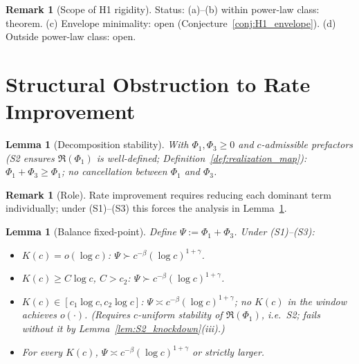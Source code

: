\documentclass[12pt,a4paper]{amsart}
\newtheorem{lemma}[theorem]{Lemma}
\theoremstyle{definition}
\newtheorem{remark}[theorem]{Remark}
\begin{document}
\begin{remark}[Scope of H1 rigidity]
\label{rem:H1_rigidity_scope}
Status: (a)--(b) within power-law class: theorem.
(c) Envelope minimality: open (Conjecture~\ref{conj:H1_envelope}).
(d) Outside power-law class: open.
\end{remark}

\section{Structural Obstruction to Rate Improvement}
\label{sec:obstruction}

\begin{lemma}[Decomposition stability]
\label{lem:decomp_stability}
With $\Phi_1,\Phi_3\geq 0$ and $c$-admissible prefactors
(S2 ensures $\mathfrak{R}(\Phi_1)$ is well-defined;
Definition~\ref{def:realization_map}):
$\Phi_1+\Phi_3\geq\Phi_1$; no cancellation between $\Phi_1$ and $\Phi_3$.
\end{lemma}

\begin{remark}[Role]
\label{rem:decomp_role}
Rate improvement requires reducing each dominant term individually;
under (S1)--(S3) this forces the analysis in Lemma~\ref{lem:balance_fixpoint}.
\end{remark}

\begin{lemma}[Balance fixed-point]
\label{lem:balance_fixpoint}
Define $\Psi := \Phi_1+\Phi_3$.
Under \textnormal{(S1)--(S3)}:
\begin{itemize}[nosep]
  \item[\textup{(i)}] $K(c)=o(\log c)$:
    $\Psi \succ c^{-\beta}(\log c)^{1+\gamma}$.
  \item[\textup{(ii)}] $K(c)\geq C\log c$, $C>c_2$:
    $\Psi \succ c^{-\beta}(\log c)^{1+\gamma}$.
  \item[\textup{(iii)}] $K(c)\in[c_1\log c,c_2\log c]$:
    $\Psi \asymp c^{-\beta}(\log c)^{1+\gamma}$;
    no $K(c)$ in the window achieves $o(\cdot)$.
    \emph{(Requires $c$-uniform stability of $\mathfrak{R}(\Phi_1)$,
    i.e.\ S2; fails without it by Lemma~\ref{lem:S2_knockdown}(iii).)}
  \item[\textup{(iv)}] For every $K(c)$,
    $\Psi \asymp c^{-\beta}(\log c)^{1+\gamma}$ or strictly larger.
\end{itemize}
\end{lemma}
\end{document}
